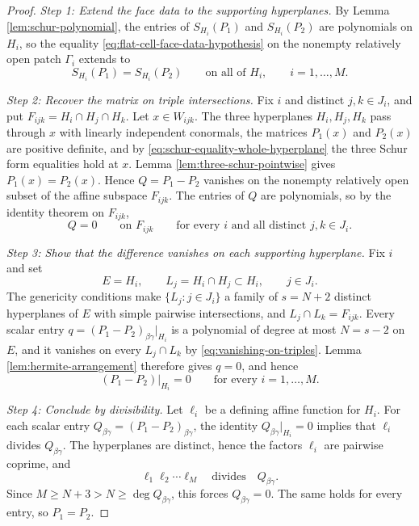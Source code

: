 \documentclass[11pt,oneside]{article}
\begin{document}
\begin{proof}
\emph{Step 1: Extend the face data to the supporting hyperplanes.}
By Lemma \ref{lem:schur-polynomial}, the entries of \(S_{H_i}(P_1)\) and
\(S_{H_i}(P_2)\) are polynomials on \(H_i\), so the equality
\eqref{eq:flat-cell-face-data-hypothesis} on the nonempty relatively open
patch \(\Gamma_i\) extends to
\begin{equation}
  S_{H_i}(P_1)=S_{H_i}(P_2)
  \qquad\text{on all of }H_i,
  \qquad i=1,\ldots,M.
  \label{eq:schur-equality-whole-hyperplane}
\end{equation}

\emph{Step 2: Recover the matrix on triple intersections.}
Fix \(i\) and distinct \(j,k\in J_i\), and put
\(F_{ijk}=H_i\cap H_j\cap H_k\).  Let \(x\in W_{ijk}\).  The three hyperplanes
\(H_i,H_j,H_k\) pass through \(x\) with linearly independent conormals, the
matrices \(P_1(x)\) and \(P_2(x)\) are positive definite, and by
\eqref{eq:schur-equality-whole-hyperplane} the three Schur form equalities hold
at \(x\).  Lemma \ref{lem:three-schur-pointwise} gives \(P_1(x)=P_2(x)\).
Hence \(Q=P_1-P_2\) vanishes on the nonempty
relatively open subset of the affine subspace \(F_{ijk}\).  The entries of
\(Q\) are polynomials, so by the identity theorem on \(F_{ijk}\),
\begin{equation}
  Q=0\qquad\text{on }F_{ijk}
  \qquad\text{for every }i\text{ and all distinct }j,k\in J_i.
  \label{eq:vanishing-on-triples}
\end{equation}

\emph{Step 3: Show that the difference vanishes on each supporting hyperplane.}
Fix \(i\) and set
\begin{equation}
  E=H_i,
  \qquad L_j=H_i\cap H_j\subset H_i,
  \qquad j\in J_i .
\end{equation}
The genericity conditions make \(\{L_j:j\in J_i\}\) a family of \(s=N+2\)
distinct hyperplanes of \(E\) with simple pairwise intersections, and
\(L_j\cap L_k=F_{ijk}\).  Every scalar entry
\(q=(P_1-P_2)_{\beta\gamma}|_{H_i}\) is a polynomial of degree at most
\(N=s-2\) on \(E\), and it vanishes on every \(L_j\cap L_k\) by
\eqref{eq:vanishing-on-triples}.  Lemma \ref{lem:hermite-arrangement} therefore
gives \(q=0\), and hence
\begin{equation}
  (P_1-P_2)|_{H_i}=0
  \qquad\text{for every }i=1,\ldots,M .
\end{equation}

\emph{Step 4: Conclude by divisibility.}
Let \(\ell_i\) be a defining affine function for \(H_i\).  For each scalar
entry \(Q_{\beta\gamma}=(P_1-P_2)_{\beta\gamma}\), the identity
\(Q_{\beta\gamma}|_{H_i}=0\) implies that \(\ell_i\) divides
\(Q_{\beta\gamma}\).  The hyperplanes are distinct, hence the factors
\(\ell_i\) are pairwise coprime, and
\begin{equation}
  \ell_1\ell_2\cdots\ell_M \quad\text{divides}\quad Q_{\beta\gamma} .
\end{equation}
Since \(M\ge N+3>N\ge\deg Q_{\beta\gamma}\), this forces
\(Q_{\beta\gamma}=0\).  The same holds for every entry, so \(P_1=P_2\).
\end{proof}
\end{document}
